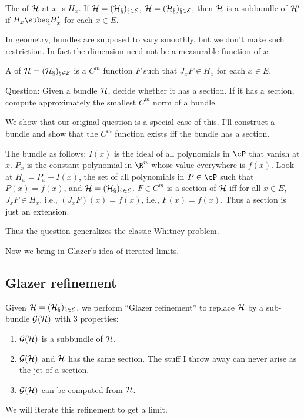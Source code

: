 \begin{df}
The  of $\cal H$ at $x$ is $H_x$. If $\cal H=(H_x)_{x\in E}$, $\cal H=(H_x)_{x\in E}$, then $\cal H$ is a subbundle of $\cal H'$ if $H_x\subeq H_x'$ for each $x\in E$. 
\end{df}
In geometry, bundles are supposed to vary smoothly, but we don't make such restriction. In fact the dimension need not be a measurable function of $x$.
\begin{df}
A  of $\cal H=(H_x)_{x\in E}$ is a $C^m$ function $F$ such that $J_xF\in H_x$ for each $x\in E$. 
\end{df}
Question: Given a bundle $\cal H$, decide whether it has a section. If it has a section, compute approximately the smallest $C^m$ norm of a bundle. 

We show that our original question is a special case of this.
I'll construct a bundle and show that the $C^m$ function exists iff the bundle has a section.

The bundle as follows: $I(x)$ is the ideal of all polynomials in $\cP$ that vanish at $x$. $P_x$ is the constant polynomial in $\R^n$ whose value everywhere is $f(x)$. 
Look at $H_x=P_x+I(x)$, the set of all polynomials in $P\in \cP$ such that $P(x)=f(x)$, and $\cal H=(H_x)_{x\in E}$. $F\in C^m$ is a section of $\cal H$ iff for all $x\in E$, $J_xF\in H_x$, i.e., $(J_xF)(x)=f(x)$, i.e., $F(x)=f(x)$. Thus a section is just an extension. 

Thus the question generalizes the classic Whitney problem.

Now we bring in Glazer's idea of iterated limits. 
\subsection{Glazer refinement}

Given $\cal H=(H_x)_{x\in E}$, we perform ``Glazer refinement'' to replace $\cal H$ by a sub-bundle $\cal G(\cal H)$ with 3 properties:
\begin{enumerate}
\item
$\cal G(\cal H)$ is a subbundle of $\cal H$.
\item
$\cal G(\cal H)$ and $\cal H$ has the same section. The stuff I throw away can never arise as the jet of a section.
\item
$\cal G(H)$ can be computed from $\cal H$.
\end{enumerate}
We will iterate this refinement to get a limit.

